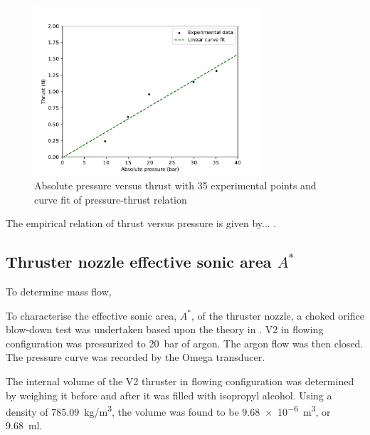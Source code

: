             \begin{figure}[!ht]
                \centering
                \includegraphics[width=0.75\textwidth]{assets/4 experiments/pressure-thrust graph.pdf}
                \caption{Absolute pressure versus thrust with 35 experimental points and curve fit of pressure-thrust relation}
                \label{fig:coldflow pressure-thrust}
            \end{figure}

            The empirical relation of thrust versus pressure is given by... .

        \subsection{Thruster nozzle effective sonic area $A^*$}

            To determine mass flow, 
        
            To characterise the effective sonic area, $A^*$, of the thruster nozzle, a choked orifice blow-down test was undertaken based upon the theory in \textcite{saadCompressibleFluidFlow}. V2 in flowing configuration was pressurized to \qty{20}{bar} of argon. The argon flow was then closed. The pressure curve was recorded by the Omega  transducer.


            The internal volume of the V2 thruster in flowing configuration was determined by weighing it before and after it was filled with isopropyl alcohol. Using a density of \qty{785.09}{kg/m^3}, the volume was found to be \qty{9.68e-6}{m^3}, or \qty{9.68}{ml}.

